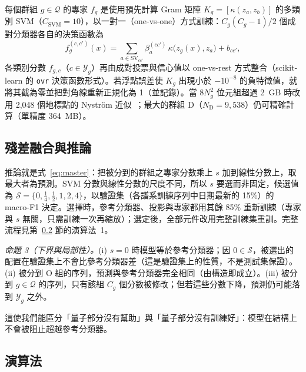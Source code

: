 \documentclass[10pt,a4paper]{article}
\begin{document}
每個群組 $g\in\mathcal{Q}$ 的專家 $f_g$ 是使用預先計算 Gram 矩陣 $K_g=[\kappa(z_a,z_b)]$ 的多類別 SVM（$C_{\mathrm{SVM}}=10$），以一對一（one-vs-one）方式訓練：$C_g(C_g-1)/2$ 個成對分類器各自的決策函數為
\begin{equation}
    f^{(c,c')}_g(x)=\sum_{a\in\mathrm{SV}_{cc'}}\beta^{(cc')}_{a}\,\kappa\big(z_g(x),z_a\big)+b_{cc'},
    \label{eq:svm}
\end{equation}
各類別分數 $f_{g,c}$（$c\in\mathcal{Y}_g$）再由成對投票與信心值以 one-vs-rest 方式整合（scikit-learn 的 \texttt{ovr} 決策函數形式）。若浮點誤差使 $K_g$ 出現小於 $-10^{-8}$ 的負特徵值，就將其截為零並把對角線重新正規化為 1（並記錄）。當 $8N_g^2$ 位元組超過 2~GB 時改用 2,048 個地標點的 Nystr\"om 近似~\cite{williams2001nystrom}；最大的群組 D（$N_{\mathrm{D}}=9{,}538$）仍可精確計算（單精度 364~MB）。

\subsection{殘差融合與推論}
\label{sec:fusion}

推論就是式~\eqref{eq:master}：把被分到的群組之專家分數乘上 $s$ 加到線性分數上，取最大者為預測。SVM 分數與線性分數的尺度不同，所以 $s$ 要選而非固定，候選值為 $\mathcal{S}=\{0,\tfrac14,\tfrac12,1,2,4\}$，以驗證集（各譜系訓練序列中日期最新的 15\%）的 macro-F1 決定。選擇時，參考分類器、投影與專家都用其餘 85\% 重新訓練（專家與 $s$ 無關，只需訓練一次再縮放）；選定後，全部元件改用完整訓練集重訓。完整流程見第~\ref{sec:algorithm} 節的演算法~1。

\textit{命題 3（下界與局部性）。}(i) $s=0$ 時模型等於參考分類器；因 $0\in\mathcal{S}$，被選出的配置在驗證集上不會比參考分類器差（這是驗證集上的性質，不是測試集保證）。(ii) 被分到 O 組的序列，預測與參考分類器完全相同（由構造即成立）。(iii) 被分到 $g\in\mathcal{Q}$ 的序列，只有該組 $C_g$ 個分數被修改；但若這些分數下降，預測仍可能落到 $\mathcal{Y}_g$ 之外。

這使我們能區分「量子部分沒有幫助」與「量子部分沒有訓練好」：模型在結構上不會被阻止超越參考分類器。

\subsection{演算法}
\label{sec:algorithm}
\end{document}
